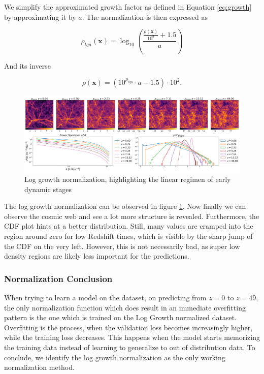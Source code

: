 \documentclass{article}
\begin{document}
We simplify the approximated growth factor as defined in Equation \ref{eq:growth} by approximating it by $a$. The normalization is then expressed as

\begin{equation}
    \rho_{lgn}(\mathbf{x}) = \log_{10}\left(\frac{\frac{\rho(\mathbf{x})}{10^2} + 1.5}{a}\right)
\end{equation}

And its inverse

\begin{equation}
    \rho(\mathbf{x}) = \left(10^{\rho_{lgn}}\cdot a - 1.5\right) \cdot 10^2.
\end{equation}

\begin{figure}[h]
    \centering
    \includegraphics[width=1\linewidth]{img/log_growth.png}
    \caption{Log growth normalization, highlighting the linear regimen of early dynamic stages}
    \label{fig:log-growth}
\end{figure}

The log growth normalization can be observed in figure \ref{fig:log-growth}. Now finally we can observe the cosmic web and see a lot more structure is revealed. Furthermore, the CDF plot hints at a better distribution. Still, many values are cramped into the region around zero for low Redshift times, which is visible by the sharp jump of the CDF on the very left. However, this is not necessarily bad, as super low density regions are likely less important for the predictions.

\subsubsection{Normalization Conclusion}

When trying to learn a model on the dataset, on predicting from $z=0$ to $z=49$, the only normalization function which does result in an immediate overfitting pattern is the one which is trained on the Log Growth normalized dataset. Overfitting is the process, when the validation loss becomes increasingly higher, while the training loss decreases. This happens when the model starts memorizing the training data instead of learning to generalize to out of distribution data. To conclude, we identify the log growth normalization as the only working normalization method.
\end{document}
